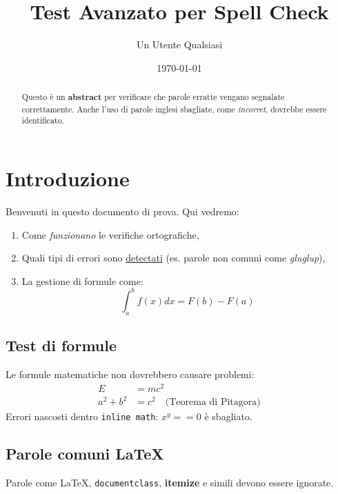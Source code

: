 \documentclass[11pt]{article}
\title{Test Avanzato per Spell Check}
\author{Un Utente Qualsiasi}
\date{\today}
\begin{document}
\maketitle

\begin{abstract}
Questo è un \textbf{abstract} per verificare che parole erratte vengano segnalate correttamente. 
Anche l'uso di parole inglesi sbagliate, come \emph{incorret}, dovrebbe essere identificato.
\end{abstract}

\tableofcontents

\section{Introduzione}
Benvenuti in questo documento di prova. Qui vedremo:
\begin{enumerate}
    \item Come \textit{funzionano} le verifiche ortografiche,
    \item Quali tipi di errori sono \underline{detectati} (es. parole non comuni come \emph{gluglup}),
    \item La gestione di formule come:
    \[
        \int_{a}^{b} f(x) dx = F(b) - F(a)
    \]
\end{enumerate}

\subsection{Test di formule}
Le formule matematiche non dovrebbero causare problemi:
\begin{align}
    E &= mc^2 \\
    a^2 + b^2 &= c^2 \quad \text{(Teorema di Pitagora)}
\end{align}
Errori nascosti dentro \texttt{inline math}: $x^y == 0$ è sbagliato.

\subsection{Parole comuni LaTeX}
Parole come \LaTeX, \texttt{documentclass}, \textbf{itemize} e simili devono essere ignorate.
\end{document}

